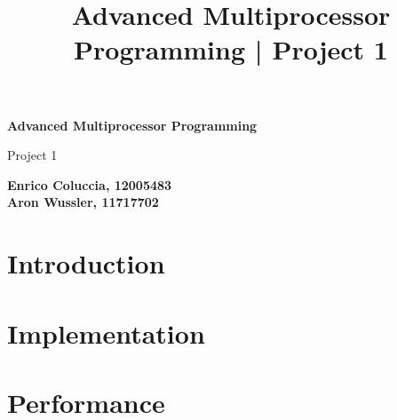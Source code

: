 \documentclass[12pt,a4paper, tikz]{article}
\begin{document}
\title{Advanced Multiprocessor Programming | Project 1}

\begin{titlepage}
    \begin{center}
        \vspace*{1cm}

        \Huge
        \textbf{Advanced Multiprocessor Programming}

        \vspace{0.5cm}
        \LARGE
        Project 1 \\

        \vspace{1.5cm}

        \small
        \textbf{Enrico Coluccia, 12005483\\ Aron Wussler, 11717702}

        \vfill

        \vspace{0.8cm}


    \end{center}
\end{titlepage}

\section{Introduction}


\section{Implementation}


\section{Performance}

\end{document}
